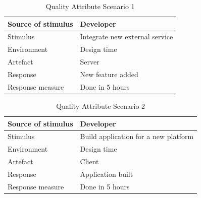 \documentclass[11pt]{book}
\begin{document}
\begin{table}[H]
  \centering
  \begin{tabular}{| l | p{11cm} |} \hline
    Source of stimulus   & Developer                                   \\ \hline
    Stimulus             & Integrate new external service              \\ \hline
    Environment          & Design time                                 \\ \hline
    Artefact             & Server                                      \\ \hline
    Response             & New feature added                           \\ \hline
    Response measure     & Done in 5 hours                             \\ \hline
  \end{tabular}
  \caption{Quality Attribute Scenario 1}
  \label{tab:TC_qas_newservice}
\end{table}

\begin{table}[H]
  \centering
  \begin{tabular}{| l | p{11cm} |} \hline
    Source of stimulus   & Developer                                   \\ \hline
    Stimulus             & Build application for a new platform        \\ \hline
    Environment          & Design time                                 \\ \hline
    Artefact             & Client                                      \\ \hline
    Response             & Application built                           \\ \hline
    Response measure     & Done in 5 hours                             \\ \hline
  \end{tabular}
  \caption{Quality Attribute Scenario 2}
  \label{tab:TC_qas_newplatform}
\end{table}
\end{document}
